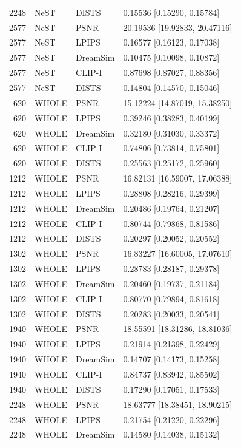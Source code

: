 \documentclass[10pt,letterpaper]{article}
\begin{document}
\begin{longtable}{@{}rlll@{}}
2248 & NeST & DISTS & 0.15536 [0.15290, 0.15784]\\
2577 & NeST & PSNR & 20.19536 [19.92833, 20.47116]\\
2577 & NeST & LPIPS & 0.16577 [0.16123, 0.17038]\\
2577 & NeST & DreamSim & 0.10475 [0.10098, 0.10872]\\
2577 & NeST & CLIP-I & 0.87698 [0.87027, 0.88356]\\
2577 & NeST & DISTS & 0.14804 [0.14570, 0.15046]\\
620 & WHOLE & PSNR & 15.12224 [14.87019, 15.38250]\\
620 & WHOLE & LPIPS & 0.39246 [0.38283, 0.40199]\\
620 & WHOLE & DreamSim & 0.32180 [0.31030, 0.33372]\\
620 & WHOLE & CLIP-I & 0.74806 [0.73814, 0.75801]\\
620 & WHOLE & DISTS & 0.25563 [0.25172, 0.25960]\\
1212 & WHOLE & PSNR & 16.82131 [16.59007, 17.06388]\\
1212 & WHOLE & LPIPS & 0.28808 [0.28216, 0.29399]\\
1212 & WHOLE & DreamSim & 0.20486 [0.19764, 0.21207]\\
1212 & WHOLE & CLIP-I & 0.80744 [0.79868, 0.81586]\\
1212 & WHOLE & DISTS & 0.20297 [0.20052, 0.20552]\\
1302 & WHOLE & PSNR & 16.83227 [16.60005, 17.07610]\\
1302 & WHOLE & LPIPS & 0.28783 [0.28187, 0.29378]\\
1302 & WHOLE & DreamSim & 0.20460 [0.19737, 0.21184]\\
1302 & WHOLE & CLIP-I & 0.80770 [0.79894, 0.81618]\\
1302 & WHOLE & DISTS & 0.20283 [0.20033, 0.20541]\\
1940 & WHOLE & PSNR & 18.55591 [18.31286, 18.81036]\\
1940 & WHOLE & LPIPS & 0.21914 [0.21398, 0.22429]\\
1940 & WHOLE & DreamSim & 0.14707 [0.14173, 0.15258]\\
1940 & WHOLE & CLIP-I & 0.84737 [0.83942, 0.85502]\\
1940 & WHOLE & DISTS & 0.17290 [0.17051, 0.17533]\\
2248 & WHOLE & PSNR & 18.63777 [18.38451, 18.90215]\\
2248 & WHOLE & LPIPS & 0.21754 [0.21220, 0.22296]\\
2248 & WHOLE & DreamSim & 0.14580 [0.14038, 0.15132]\\

\end{longtable}
\end{document}
